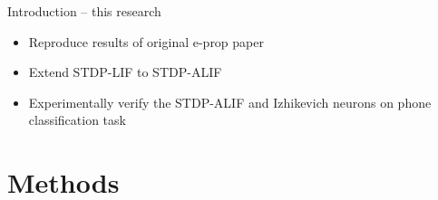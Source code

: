 \documentclass[t]{beamer}
\begin{document}
  \begin{frame}{Introduction -- this research}

    \begin{itemize}[label=--]
      \item Reproduce results of original e-prop paper
      \item Extend STDP-LIF to STDP-ALIF
      \item Experimentally verify the STDP-ALIF and Izhikevich neurons on phone classification task
    \end{itemize}
  \end{frame}


\section{Methods}
\end{document}
